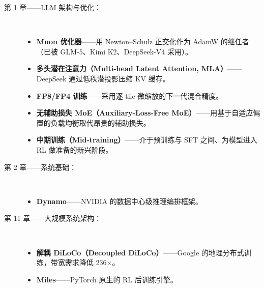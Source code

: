 \documentclass[11pt,a4paper,openany]{book}
\begin{document}
\begin{description}
  \item[第 1 章——LLM 架构与优化：]~
    \begin{itemize}
      \item \textbf{Muon 优化器}——用 Newton--Schulz 正交化作为 AdamW 的继任者（已被 GLM-5、Kimi K2、DeepSeek-V4 采用）。
      \item \textbf{多头潜在注意力（Multi-head Latent Attention, MLA）}——DeepSeek 通过低秩潜投影压缩 KV 缓存。
      \item \textbf{FP8/FP4 训练}——采用逐 tile 微缩放的下一代混合精度。
      \item \textbf{无辅助损失 MoE（Auxiliary-Loss-Free MoE）}——用基于自适应偏置的负载均衡取代昂贵的辅助损失。
      \item \textbf{中期训练（Mid-training）}——介于预训练与 SFT 之间、为模型进入 RL 做准备的新兴阶段。
    \end{itemize}

  \item[第 2 章——系统基础：]~
    \begin{itemize}
      \item \textbf{Dynamo}——NVIDIA 的数据中心级推理编排框架。
    \end{itemize}

  \item[第 11 章——大规模系统架构：]~
    \begin{itemize}
      \item \textbf{解耦 DiLoCo（Decoupled DiLoCo）}——Google 的地理分布式训练，带宽需求降低 236$\times$。
      \item \textbf{Miles}——PyTorch 原生的 RL 后训练引擎。
    \end{itemize}


\end{description}
\end{document}
